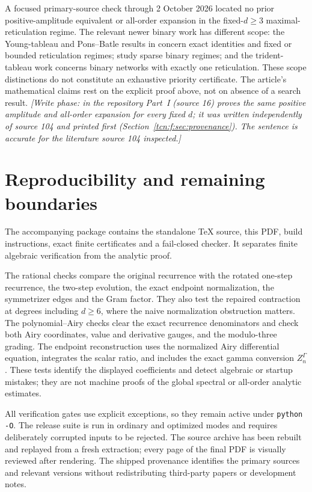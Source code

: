 \documentclass[11pt,letterpaper]{article}
\theoremstyle{remark}
\begin{document}
A focused primary-source check through 2 October 2026 located no prior positive-amplitude equivalent or all-order expansion in the fixed-$d\ge3$ maximal-reticulation regime. The relevant newer binary work has different scope: the Young-tableau and Pons--Batle results in \cite{LL2026,LWY2026,YZ2026short} concern exact identities and fixed or bounded reticulation regimes; \cite{YZ2026,FY2026} study sparse binary regimes; and the trident-tableau work \cite{Liu2026} concerns binary networks with exactly one reticulation. These scope distinctions do not constitute an exhaustive priority certificate. The article's mathematical claims rest on the explicit proof above, not on absence of a search result. \emph{[Write phase: in the repository Part~I (source 16) proves the same positive amplitude and all-order expansion for every fixed $d$; it was written independently of source 104 and printed first (Section~\ref{tcn:f:sec:provenance}). The sentence is accurate for the literature source 104 inspected.]}

\section{Reproducibility and remaining boundaries}\label{tcn:f:sec:reproducibility}
The accompanying package contains the standalone TeX source, this PDF, build instructions, exact finite certificates and a fail-closed checker. It separates finite algebraic verification from the analytic proof.

The rational checks compare the original recurrence with the rotated one-step recurrence, the two-step evolution, the exact endpoint normalization, the symmetrizer edges and the Gram factor. They also test the repaired contraction at degrees including $d\ge6$, where the naive normalization obstruction matters. The polynomial--Airy checks clear the exact recurrence denominators and check both Airy coordinates, value and derivative gauges, and the modulo-three grading. The endpoint reconstruction uses the normalized Airy differential equation, integrates the scalar ratio, and includes the exact gamma conversion $Z^\Gamma_n$. These tests identify the displayed coefficients and detect algebraic or startup mistakes; they are not machine proofs of the global spectral or all-order analytic estimates.

All verification gates use explicit exceptions, so they remain active under \texttt{python -O}. The release suite is run in ordinary and optimized modes and requires deliberately corrupted inputs to be rejected. The source archive has been rebuilt and replayed from a fresh extraction; every page of the final PDF is visually reviewed after rendering. The shipped provenance identifies the primary sources and relevant versions without redistributing third-party papers or development notes.
\end{document}
